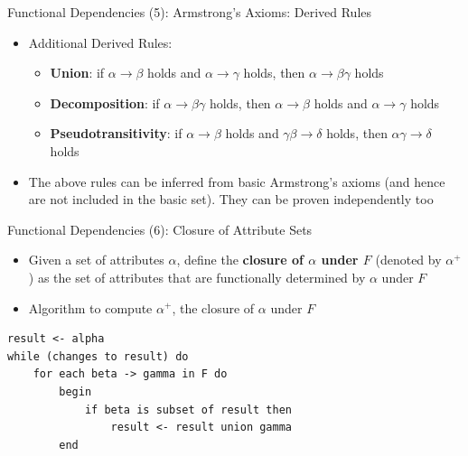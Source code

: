 \documentclass[aspectratio=169, xcolor=dvipsnames]{beamer}
\begin{document}
\begin{frame}{Functional Dependencies (5): Armstrong's Axioms: Derived Rules}
    \begin{itemize}[<+->]
        \item Additional Derived Rules:
        \begin{itemize}
            \item[$\triangleright$] \textbf{Union}: if $\alpha \rightarrow \beta$ holds and $\alpha \rightarrow \gamma$ holds, then $\alpha \rightarrow \beta\gamma$ holds
            \item[$\triangleright$] \textbf{Decomposition}: if $\alpha \rightarrow \beta\gamma$ holds, then $\alpha \rightarrow \beta$ holds and $\alpha \rightarrow \gamma$ holds
            \item[$\triangleright$] \textbf{Pseudotransitivity}: if $\alpha \rightarrow \beta$ holds and $\gamma\beta \rightarrow \delta$ holds, then $\alpha\gamma \rightarrow \delta$ holds
        \end{itemize}
        \item The above rules can be inferred from basic Armstrong's axioms (and hence are not included in the basic set). They can be proven independently too
    \end{itemize}
\end{frame}

\begin{frame}[fragile]{Functional Dependencies (6): Closure of Attribute Sets}
    \begin{itemize}[<+->]
        \item Given a set of attributes $\alpha$, define the \textbf{closure of $\alpha$ under $F$} (denoted by $\alpha^+$) as the set of attributes that are functionally determined by $\alpha$ under $F$
        \item Algorithm to compute $\alpha^+$, the closure of $\alpha$ under $F$
    \end{itemize}
    \vspace{1em}
    \begin{verbatim}
result <- alpha
while (changes to result) do
    for each beta -> gamma in F do
        begin
            if beta is subset of result then
                result <- result union gamma
        end
    \end{verbatim}
\end{frame}
\end{document}
